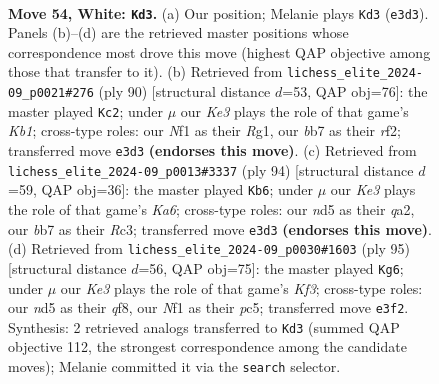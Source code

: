 \documentclass[11pt]{article}
\begin{document}
\clearpage

\begin{figure}[p]\centering
\begin{subfigure}{0.46\textwidth}\centering
\resizebox{\linewidth}{!}{%
\newchessgame
\chessboard[
  setfen={8/qb3pk1/6p1/3n4/3R3P/4K3/4R2P/5N2 w - - 15 54},
  showmover=false,
  pgfstyle=straightmove, color=movearrow, markmove={e3-d3}
]}
\caption{}
\end{subfigure}\hfill
\begin{subfigure}{0.46\textwidth}\centering
\resizebox{\linewidth}{!}{%
\newchessgame
\chessboard[
  setfen={6k1/6pp/8/b2N4/P2P4/8/3n1r2/RK4R1 w - - 3 46},
  showmover=false,
  pgfstyle=straightmove, color=movearrow, markmove={b1-c2}
]}
\caption{}
\end{subfigure}
\\[4pt]
\begin{subfigure}{0.46\textwidth}\centering
\resizebox{\linewidth}{!}{%
\newchessgame
\chessboard[
  setfen={8/2R2pk1/K3p3/1P6/8/2R3P1/q7/8 w - - 9 48},
  showmover=false,
  pgfstyle=straightmove, color=movearrow, markmove={a6-b6}
]}
\caption{}
\end{subfigure}\hfill
\begin{subfigure}{0.46\textwidth}\centering
\resizebox{\linewidth}{!}{%
\newchessgame
\chessboard[
  setfen={5Q2/8/5k1p/2P2pp1/8/7P/r2r1PK1/8 b - - 10 48},
  showmover=false,
  pgfstyle=straightmove, color=movearrow, markmove={f6-g6}
]}
\caption{}
\end{subfigure}
\caption{\textbf{Move 54, White: \texttt{Kd3}.} (a) Our position; Melanie plays \texttt{Kd3} (\texttt{e3d3}). Panels (b)--(d) are the retrieved master positions whose correspondence most drove this move (highest QAP objective among those that transfer to it). (b) Retrieved from \texttt{lichess\_elite\_2024-09\_p0021\#276} (ply 90) [structural distance $d$=53, QAP obj=76]: the master played \texttt{Kc2}; under $\mu$ our \emph{Ke3} plays the role of that game's \emph{Kb1}; cross-type roles: our \emph{N}f1 as their \emph{R}g1, our \emph{b}b7 as their \emph{r}f2; transferred move \texttt{e3d3} \textbf{(endorses this move)}. (c) Retrieved from \texttt{lichess\_elite\_2024-09\_p0013\#3337} (ply 94) [structural distance $d$=59, QAP obj=36]: the master played \texttt{Kb6}; under $\mu$ our \emph{Ke3} plays the role of that game's \emph{Ka6}; cross-type roles: our \emph{n}d5 as their \emph{q}a2, our \emph{b}b7 as their \emph{R}c3; transferred move \texttt{e3d3} \textbf{(endorses this move)}. (d) Retrieved from \texttt{lichess\_elite\_2024-09\_p0030\#1603} (ply 95) [structural distance $d$=56, QAP obj=75]: the master played \texttt{Kg6}; under $\mu$ our \emph{Ke3} plays the role of that game's \emph{Kf3}; cross-type roles: our \emph{n}d5 as their \emph{q}f8, our \emph{N}f1 as their \emph{p}c5; transferred move \texttt{e3f2}. Synthesis: 2 retrieved analogs transferred to \texttt{Kd3} (summed QAP objective 112, the strongest correspondence among the candidate moves); Melanie committed it via the \texttt{search} selector.}
\label{fig:thought-m106}
\end{figure}
\end{document}
